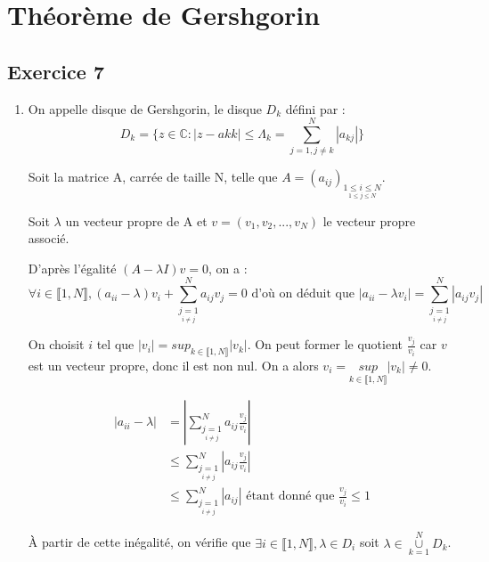 \documentclass[a4paper,11pt]{article}
\newcommand{\C}{\mathbb{C}}
\theoremstyle{nonumberplain}
\theoremstyle{nonumberplain}
\theoremstyle{nonumberplain}
\begin{document}
\section{Théorème de Gershgorin}

\subsection*{Exercice 7}

    \begin{enumerate}
        \setlength\itemsep{2em}
        \item
        On appelle disque de Gershgorin, le disque $D_{k}$ défini par :
        $$D_{k} = \{ z \in \C : |z - a{kk}| \leq \Lambda_{k} = \sum\limits_{j=1, j\ne k}^{N} |a_{kj}| \}$$

        Soit la matrice A, carrée de taille N, telle que $A = (a_{ij})_{\underset {1 \leq j \leq N}{1 \leq i \leq N}}$.

        Soit $\lambda$ un vecteur propre de A et $v = (v_1, v_2, ..., v_N)$ le vecteur propre associé.

        D'après l'égalité $(A - \lambda I)v = 0$, on a :
        $$\forall i \in \llbracket 1 , N \rrbracket, (a_{ii} - \lambda)v_i + \sum\limits_{\underset{i \ne j}{j = 1}}^{N} a_{ij}v_j = 0 \text{ d'où on déduit que } |a_{ii} - \lambda v_{i}| = \sum\limits_{\underset{i \ne j}{j = 1}}^{N} |a_{ij}v_j|$$

        On choisit $i$ tel que $|v_{i}| = sup_{k \in \llbracket 1 , N \rrbracket} |v_{k}|$. On peut former le quotient $\frac{v_j}{v_{i}}$ car $v$ est un
        vecteur propre, donc il est non nul. On a alors $v_{i} = \underset{k \in \llbracket 1 , N \rrbracket}{sup} |v_{k}| \ne 0$.

        \begin{equation*}
            \begin{split}
                |a_{ii} - \lambda|  & = |\sum\limits_{\underset{i \ne j}{j = 1}}^{N} a_{ij} \frac{v_j}{v_{i}}| \\
                                    & \leq \sum\limits_{\underset{i \ne j}{j = 1}}^{N} |a_{ij} \frac{v_j}{v_{i}}| \\
                                    & \leq \sum\limits_{\underset{i \ne j}{j = 1}}^{N} |a_{ij}| \text{ étant donné que } \frac{v_j}{v_{i}} \leq 1
            \end{split}
        \end{equation*}

        \`{A} partir de cette inégalité, on vérifie que $\exists i \in \llbracket 1 , N \rrbracket,  \lambda \in D_{i}$ soit $\lambda \in \underset{k = 1}{\overset{N}{\cup}} D_{k}$.


\end{enumerate}
\end{document}
